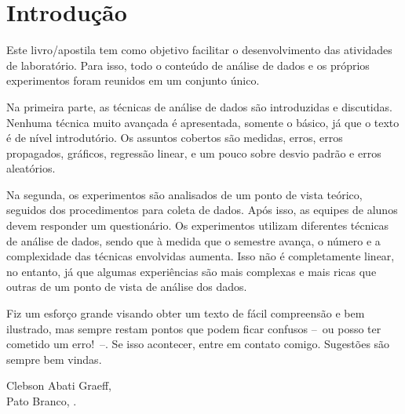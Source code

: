 \chapter*{Introdução}

Este livro/apostila tem como objetivo facilitar o desenvolvimento das atividades de laboratório. Para isso, todo o conteúdo de análise de dados e os próprios experimentos foram reunidos em um conjunto único. 

Na primeira parte, as técnicas de análise de dados são introduzidas e discutidas. Nenhuma técnica muito avançada é apresentada, somente o básico, já que o texto é de nível introdutório. Os assuntos cobertos são medidas, erros, erros propagados, gráficos, regressão linear, e um pouco sobre desvio padrão e erros aleatórios.

Na segunda, os experimentos são analisados de um ponto de vista teórico, seguidos dos procedimentos para coleta de dados. Após isso, as equipes de alunos devem responder um questionário. Os experimentos utilizam diferentes técnicas de análise de dados, sendo que à medida que o semestre avança, o número e a complexidade das técnicas envolvidas aumenta. Isso não é completamente linear, no entanto, já que algumas experiências são mais complexas e mais ricas que outras de um ponto de vista de análise dos dados.

Fiz um esforço grande visando obter um texto de fácil compreensão e bem ilustrado, mas sempre restam pontos que podem ficar confusos --~ou posso ter cometido um erro!~--. Se isso acontecer, entre em contato comigo. Sugestões são sempre bem vindas.

\vspace{1cm}
\begin{flushright}
Clebson Abati Graeff,\\
Pato Branco, \monthyear.
\end{flushright}

